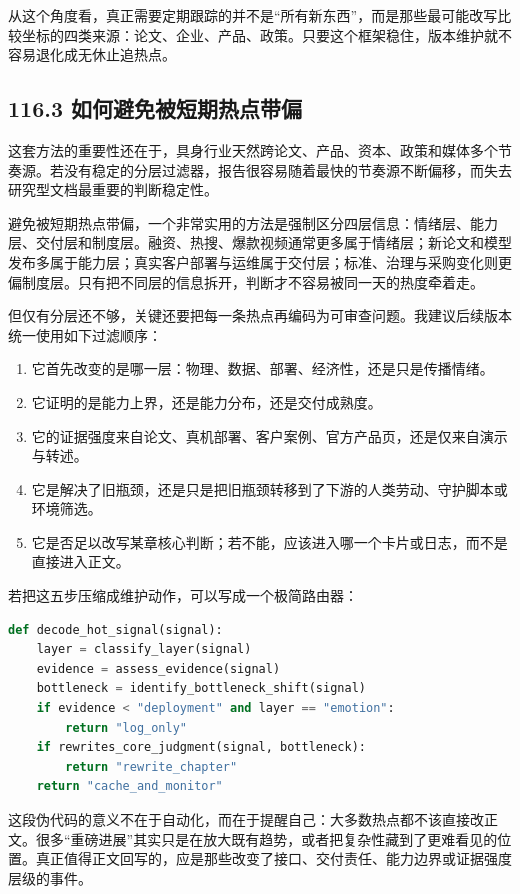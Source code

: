 从这个角度看，真正需要定期跟踪的并不是“所有新东西”，而是那些最可能改写比较坐标的四类来源：论文、企业、产品、政策。只要这个框架稳住，版本维护就不容易退化成无休止追热点。

\subsection*{116.3 如何避免被短期热点带偏}


这套方法的重要性还在于，具身行业天然跨论文、产品、资本、政策和媒体多个节奏源。若没有稳定的分层过滤器，报告很容易随着最快的节奏源不断偏移，而失去研究型文档最重要的判断稳定性。

避免被短期热点带偏，一个非常实用的方法是强制区分四层信息：情绪层、能力层、交付层和制度层。融资、热搜、爆款视频通常更多属于情绪层；新论文和模型发布多属于能力层；真实客户部署与运维属于交付层；标准、治理与采购变化则更偏制度层。只有把不同层的信息拆开，判断才不容易被同一天的热度牵着走。

但仅有分层还不够，关键还要把每一条热点再编码为可审查问题。我建议后续版本统一使用如下过滤顺序：

\begin{enumerate}
\item 它首先改变的是哪一层：物理、数据、部署、经济性，还是只是传播情绪。
\item 它证明的是能力上界，还是能力分布，还是交付成熟度。
\item 它的证据强度来自论文、真机部署、客户案例、官方产品页，还是仅来自演示与转述。
\item 它是解决了旧瓶颈，还是只是把旧瓶颈转移到了下游的人类劳动、守护脚本或环境筛选。
\item 它是否足以改写某章核心判断；若不能，应该进入哪一个卡片或日志，而不是直接进入正文。
\end{enumerate}

若把这五步压缩成维护动作，可以写成一个极简路由器：

\begin{lstlisting}[language=python]
def decode_hot_signal(signal):
    layer = classify_layer(signal)
    evidence = assess_evidence(signal)
    bottleneck = identify_bottleneck_shift(signal)
    if evidence < "deployment" and layer == "emotion":
        return "log_only"
    if rewrites_core_judgment(signal, bottleneck):
        return "rewrite_chapter"
    return "cache_and_monitor"
\end{lstlisting}

这段伪代码的意义不在于自动化，而在于提醒自己：大多数热点都不该直接改正文。很多“重磅进展”其实只是在放大既有趋势，或者把复杂性藏到了更难看见的位置。真正值得正文回写的，应是那些改变了接口、交付责任、能力边界或证据强度层级的事件。

